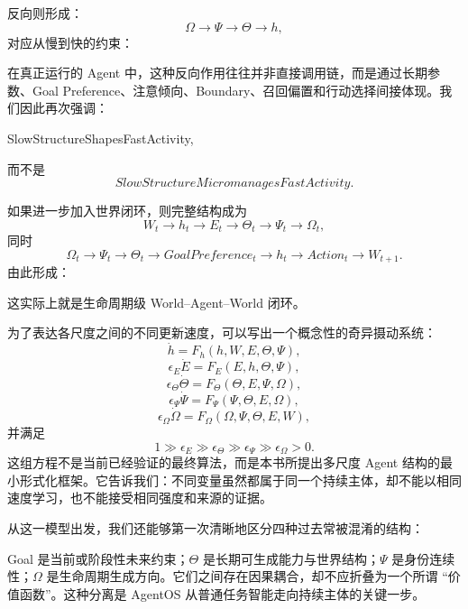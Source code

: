 反向则形成：
\[
\Omega
\rightarrow
\Psi
\rightarrow
\Theta
\rightarrow
h,
\]
对应从慢到快的约束：
\begin{statementbox}
\centering
{}
\end{statementbox}
在真正运行的 Agent 中，这种反向作用往往并非直接调用链，而是通过长期参数、Goal Preference、注意倾向、Boundary、召回偏置和行动选择间接体现。我们因此再次强调：
\begin{statementbox}
SlowStructureShapesFastActivity,
\end{statementbox}
而不是
\[
SlowStructureMicromanagesFastActivity.
\]

如果进一步加入世界闭环，则完整结构成为
\[
W_t
\rightarrow
h_t
\rightarrow
E_t
\rightarrow
\Theta_t
\rightarrow
\Psi_t
\rightarrow
\Omega_t,
\]
同时
\[
\Omega_t
\rightarrow
\Psi_t
\rightarrow
\Theta_t
\rightarrow
GoalPreference_t
\rightarrow
h_t
\rightarrow
Action_t
\rightarrow
W_{t+1}.
\]
由此形成：
\begin{statementbox}
\centering
{}
\end{statementbox}
这实际上就是生命周期级 World--Agent--World 闭环。

为了表达各尺度之间的不同更新速度，可以写出一个概念性的奇异摄动系统：
\[
\dot h
=
F_h(h,W,E,\Theta,\Psi),
\]
\[
\epsilon_E\dot E
=
F_E(E,h,\Theta,\Psi),
\]
\[
\epsilon_{\Theta}\dot\Theta
=
F_{\Theta}(\Theta,E,\Psi,\Omega),
\]
\[
\epsilon_{\Psi}\dot\Psi
=
F_{\Psi}(\Psi,\Theta,E,\Omega),
\]
\[
\epsilon_{\Omega}\dot\Omega
=
F_{\Omega}(\Omega,\Psi,\Theta,E,W),
\]
并满足
\[
1
\gg
\epsilon_E
\gg
\epsilon_{\Theta}
\gg
\epsilon_{\Psi}
\gg
\epsilon_{\Omega}
>0.
\]
这组方程不是当前已经验证的最终算法，而是本书所提出多尺度 Agent 结构的最小形式化框架。它告诉我们：不同变量虽然都属于同一个持续主体，却不能以相同速度学习，也不能接受相同强度和来源的证据。

从这一模型出发，我们还能够第一次清晰地区分四种过去常被混淆的结构：
\begin{statementbox}
\centering
{}
\end{statementbox}
Goal 是当前或阶段性未来约束；$\Theta$ 是长期可生成能力与世界结构；$\Psi$ 是身份连续性；$\Omega$ 是生命周期生成方向。它们之间存在因果耦合，却不应折叠为一个所谓 ``价值函数''。这种分离是 AgentOS 从普通任务智能走向持续主体的关键一步。

